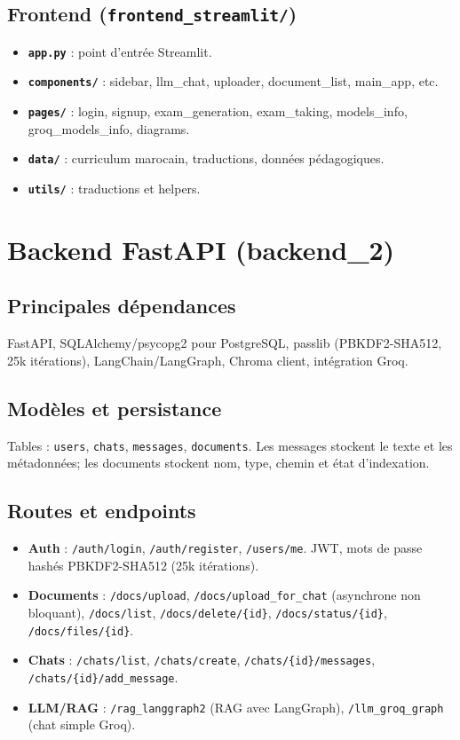 \subsection{Frontend (\texttt{frontend\_streamlit/})}
\begin{itemize}
    \item \textbf{\texttt{app.py}} : point d'entrée Streamlit.
    \item \textbf{\texttt{components/}} : sidebar, llm\_chat, uploader, document\_list, main\_app, etc.
    \item \textbf{\texttt{pages/}} : login, signup, exam\_generation, exam\_taking, models\_info, groq\_models\_info, diagrams.
    \item \textbf{\texttt{data/}} : curriculum marocain, traductions, données pédagogiques.
    \item \textbf{\texttt{utils/}} : traductions et helpers.
\end{itemize}

\section{Backend FastAPI (backend\_2)}

\subsection{Principales dépendances}
FastAPI, SQLAlchemy/psycopg2 pour PostgreSQL, passlib (PBKDF2-SHA512, 25k itérations), LangChain/LangGraph, Chroma client, intégration Groq.

\subsection{Modèles et persistance}
Tables : \texttt{users}, \texttt{chats}, \texttt{messages}, \texttt{documents}. Les messages stockent le texte et les métadonnées; les documents stockent nom, type, chemin et état d'indexation.

\subsection{Routes et endpoints}
\begin{itemize}
    \item \textbf{Auth} : \texttt{/auth/login}, \texttt{/auth/register}, \texttt{/users/me}. JWT, mots de passe hashés PBKDF2-SHA512 (25k itérations).
    \item \textbf{Documents} : \texttt{/docs/upload}, \texttt{/docs/upload\_for\_chat} (asynchrone non bloquant), \texttt{/docs/list}, \texttt{/docs/delete/\{id\}}, \texttt{/docs/status/\{id\}}, \texttt{/docs/files/\{id\}}.
    \item \textbf{Chats} : \texttt{/chats/list}, \texttt{/chats/create}, \texttt{/chats/\{id\}/messages}, \texttt{/chats/\{id\}/add\_message}.
    \item \textbf{LLM/RAG} : \texttt{/rag\_langgraph2} (RAG avec LangGraph), \texttt{/llm\_groq\_graph} (chat simple Groq).
\end{itemize}

